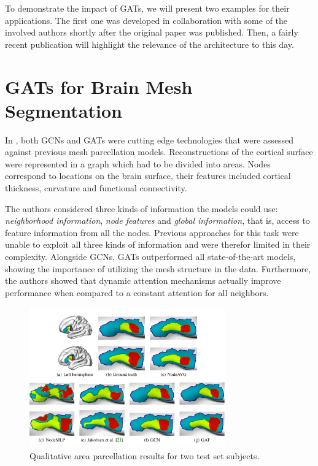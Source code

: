 \label{chapter:applications}

To demonstrate the impact of GATs, we will present two examples for their applications. The first one was developed in collaboration with some of the involved authors shortly after the original paper was published. Then, a fairly recent publication will highlight the relevance of the architecture to this day.

\section*{GATs for Brain Mesh Segmentation}
In \cite{Cucurull2018ConvolutionalNN}, both GCNs and GATs were cutting edge technologies that were assessed against previous mesh parcellation models. Reconstructions of the cortical surface were represented in a graph which had to be divided into areas. Nodes correspond to locations on the brain surface, their features included cortical thickness, curvature and functional connectivity.

The authors considered three kinds of information the models could use: \textit{neighborhood information}, \textit{node features} and \textit{global information}, that is, access to feature information from all the nodes. 
Previous approaches for this task were unable to exploit all three kinds of information and were therefor limited in their complexity. Alongside GCNs, GATs outperformed all state-of-the-art models, showing the importance of utilizing the mesh structure in the data. Furthermore, the authors showed that dynamic attention mechanisms actually improve performance when compared to a constant attention for all neighbors.

\begin{figure}[h]
    \centering
    \includegraphics[width=0.75\textwidth]{img/brain_mesh.PNG}
    \caption{Qualitative area parcellation results for two test set subjects. \cite{Cucurull2018ConvolutionalNN}}
\end{figure}

